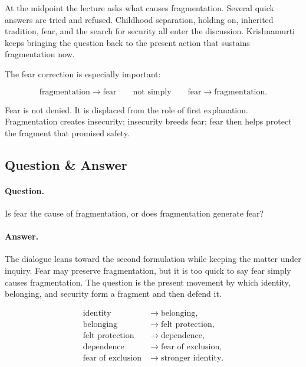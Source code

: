 \documentclass[11pt,oneside]{book}
\begin{document}
At the midpoint the lecture asks what causes fragmentation. Several quick answers are tried and refused. Childhood separation, holding on, inherited tradition, fear, and the search for security all enter the discussion. Krishnamurti keeps bringing the question back to the present action that sustains fragmentation now.

The fear correction is especially important:

\begin{equation}
\text{fragmentation}
\longrightarrow
\text{fear}
\qquad
\text{not simply}
\qquad
\text{fear}
\longrightarrow
\text{fragmentation}.
\end{equation}

Fear is not denied. It is displaced from the role of first explanation. Fragmentation creates insecurity; insecurity breeds fear; fear then helps protect the fragment that promised safety.

\subsection{Question \& Answer}

\paragraph{Question.}
Is fear the cause of fragmentation, or does fragmentation generate fear?

\paragraph{Answer.}
The dialogue leans toward the second formulation while keeping the matter under inquiry. Fear may preserve fragmentation, but it is too quick to say fear simply causes fragmentation. The question is the present movement by which identity, belonging, and security form a fragment and then defend it.

\begin{align}
\text{identity} &\longrightarrow \text{belonging},\\
\text{belonging} &\longrightarrow \text{felt protection},\\
\text{felt protection} &\longrightarrow \text{dependence},\\
\text{dependence} &\longrightarrow \text{fear of exclusion},\\
\text{fear of exclusion} &\longrightarrow \text{stronger identity}.
\end{align}
\end{document}
